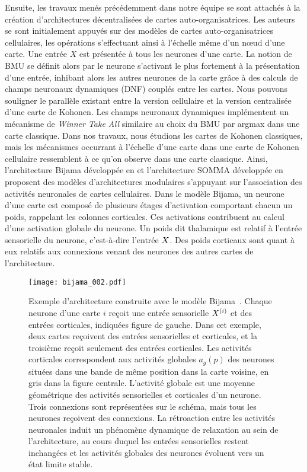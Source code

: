 \documentclass[../main]{subfiles}
\begin{document}
Ensuite, les travaux menés précédemment dans notre équipe se sont attachés à la création d'architectures décentralisées de cartes auto-organisatrices.
Les auteurs se sont initialement appuyés sur des modèles de cartes auto-organisatrices cellulaires, les opérations s'effectuant ainsi à l'échelle même d'un n\oe{}ud d'une carte. Une entrée $X$ est présentée à tous les neurones d'une carte. La notion de BMU se définit alors par le neurone s'activant le plus fortement à la présentation d'une entrée, inhibant alors les autres neurones de la carte grâce à des calculs de champs neuronaux dynamiques (DNF) couplés entre les cartes.
Nous pouvons souligner le parallèle existant entre la version cellulaire et la version centralisée d'une carte de Kohonen. 
Les champs neuronaux dynamiques implémentent un mécanisme de \emph{Winner Take All} similaire au choix du BMU par argmax dans une carte classique. Dans nos travaux, nous étudions les cartes de Kohonen classiques, mais les mécanismes occurrant à l'échelle d'une carte dans une carte de Kohonen cellulaire ressemblent à ce qu'on observe dans une carte classique.
Ainsi, l'architecture Bijama développée en \cite{menard05} et l'architecture SOMMA développée en \cite{lefort_unlearning_2011} proposent des modèles d'architectures modulaires s'appuyant sur l'association des activités neuronales de cartes cellulaires. 
Dans le modèle Bijama, un neurone d'une carte est composé de plusieurs étages d'activation comportant chacun un poids, rappelant les colonnes corticales. Ces activations contribuent au calcul d'une activation globale du neurone.
Un poids dit thalamique est relatif à l'entrée sensorielle du neurone, c'est-à-dire l'entrée $X$.
Des poids corticaux sont quant à eux relatifs aux connexions venant des neurones des autres cartes de l'architecture.

\begin{figure}
    \centering
    \texttt{[image: bijama\_002.pdf]}
    \caption{Exemple d'architecture construite avec le modèle Bijama~\parencite{menard05}.
    Chaque neurone d'une carte $i$ reçoit une entrée sensorielle $X^{({i})}$ et des entrées corticales, indiquées figure de gauche.
    Dans cet exemple, deux cartes reçoivent des entrées sensorielles et corticales, et la troisième reçoit seulement des entrées corticales.
    Les activités corticales correspondent aux activités globales $a_g(p)$ des neurones situées dans une bande de même position dans la carte voisine, en gris dans la figure centrale. L'activité globale est une moyenne géométrique des activités sensorielles et corticales d'un neurone.
    Trois connexions sont représentées sur le schéma, mais tous les neurones reçoivent des connexions.
    La rétroaction entre les activités neuronales induit un phénomène dynamique de relaxation au sein de l'architecture, au cours duquel les entrées sensorielles restent inchangées et les activités globales des neurones évoluent vers un état limite stable. \label{fig:bijama}}
\end{figure}
\end{document}

